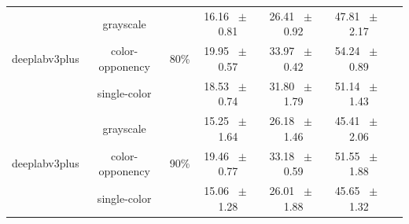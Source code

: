 \begin{table}[h]
\begin{tabular}{@{}lccc ccc@{}}
    \midrule
    \multirow{3}{*}{deeplabv3plus} & grayscale & \multirow{3}{*}{80\%} & 16.16 ~$\pm$~ 0.81 & 26.41 ~$\pm$~ 0.92 & 47.81 ~$\pm$~ 2.17 \\
    & color-opponency & & 19.95 ~$\pm$~ 0.57 & 33.97 ~$\pm$~ 0.42 & 54.24 ~$\pm$~ 0.89 \\
    & single-color & & 18.53 ~$\pm$~ 0.74 & 31.80 ~$\pm$~ 1.79 & 51.14 ~$\pm$~ 1.43 \\
    \midrule
    \multirow{3}{*}{deeplabv3plus} & grayscale & \multirow{3}{*}{90\%} & 15.25 ~$\pm$~ 1.64 & 26.18 ~$\pm$~ 1.46 & 45.41 ~$\pm$~ 2.06 \\
    & color-opponency & & 19.46 ~$\pm$~ 0.77 & 33.18 ~$\pm$~ 0.59 & 51.55 ~$\pm$~ 1.88 \\
    & single-color & & 15.06 ~$\pm$~ 1.28 & 26.01 ~$\pm$~ 1.88 & 45.65 ~$\pm$~ 1.32 \\
    \midrule
    \bottomrule
  \end{tabular}
  \label{tab:sparse_deeplabv3plus_dark_zurich}
\end{table}